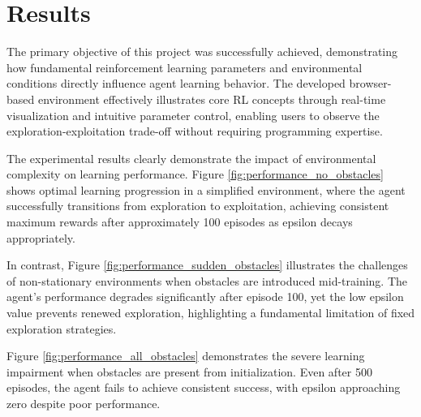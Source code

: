 \section{Results}

The primary objective of this project was successfully achieved, demonstrating how fundamental reinforcement learning parameters and environmental conditions directly influence agent learning behavior. The developed browser-based environment effectively illustrates core RL concepts through real-time visualization and intuitive parameter control, enabling users to observe the exploration-exploitation trade-off without requiring programming expertise.

The experimental results clearly demonstrate the impact of environmental complexity on learning performance. Figure \ref{fig:performance_no_obstacles} shows optimal learning progression in a simplified environment, where the agent successfully transitions from exploration to exploitation, achieving consistent maximum rewards after approximately 100 episodes as epsilon decays appropriately.


In contrast, Figure \ref{fig:performance_sudden_obstacles} illustrates the challenges of non-stationary environments when obstacles are introduced mid-training. The agent's performance degrades significantly after episode 100, yet the low epsilon value prevents renewed exploration, highlighting a fundamental limitation of fixed exploration strategies.


Figure \ref{fig:performance_all_obstacles} demonstrates the severe learning impairment when obstacles are present from initialization. Even after 500 episodes, the agent fails to achieve consistent success, with epsilon approaching zero despite poor performance.

